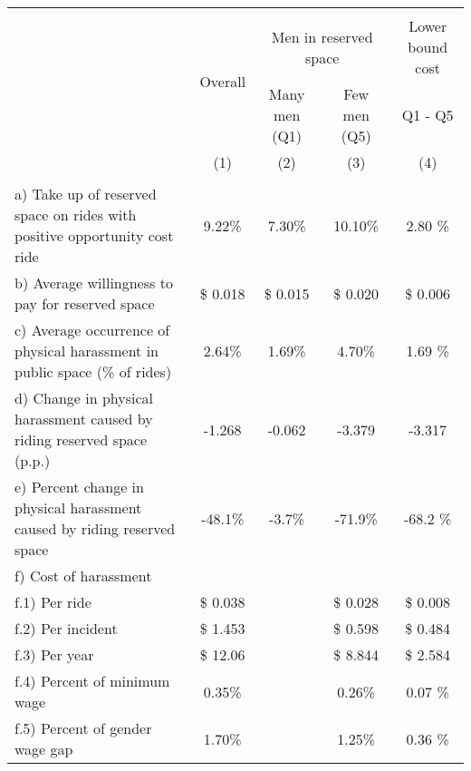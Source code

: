 \begin{tabular}{lcccc}
       \hline\hline  \\[-1.8ex] 
       & \multirow{2}{*}{Overall} & \multicolumn{2}{c}{Men in reserved space} & Lower bound cost \\
       &  & Many men (Q1) & Few men (Q5)  & Q1 - Q5 \\
       & (1) & (2) & (3) & (4)  \\
       \hline   \\[-1.8ex]
       a) Take up of reserved space on rides with positive opportunity cost ride  &         9.22\% &        7.30\% &       10.10\% &        2.80 \%  \\
       b) Average willingness to pay for reserved space                                                   & \$   0.018   & \$   0.015   & \$   0.020   & \$   0.006     \\
       c) Average occurrence of physical harassment in public space (\% of rides) &        2.64\% &        1.69\% &        4.70\% &        1.69 \%  \\
       d) Change in physical harassment caused by riding reserved space (p.p.)    &      -1.268   &      -0.062   &      -3.379   &      -3.317     \\
       e) Percent change in physical harassment caused by riding reserved space   &       -48.1\% &        -3.7\% &       -71.9\% &       -68.2 \%  \\
       \multicolumn{5}{l}{f) Cost of harassment} \\
       f.1) Per ride                                                                                                                      & \$   0.038   &       & \$   0.028   & \$   0.008     \\
       f.2) Per incident                                                                                                                  & \$   1.453   &       & \$   0.598   & \$   0.484     \\
       f.3) Per year                                                                                                                      & \$   12.06   &       & \$   8.844   & \$   2.584     \\
       f.4) Percent of minimum wage                                                                                       &        0.35\% &       &              0.26\% &        0.07 \%  \\
       f.5) Percent of gender wage gap                                                                                    &        1.70\% &       &              1.25\% &        0.36 \%  \\
       \hline \hline
\end{tabular}